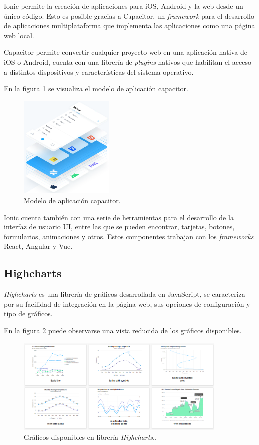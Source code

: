 Ionic permite la creación de aplicaciones para iOS, Android y la web desde un único código. Esto es posible gracias a Capacitor, un \textit{framework} para el desarrollo de aplicaciones multiplataforma que implementa las aplicaciones como una página web local.

Capacitor permite convertir cualquier proyecto web en una aplicación nativa de iOS o Android, cuenta con una librería de \textit{plugins} nativos que habilitan el acceso a distintos dispositivos y características del sistema operativo\citep{ioni2}.

En la figura \ref{fig:capacitor} se visualiza el modelo de aplicación capacitor.

\begin{figure}[htbp]
	\centering
	\includegraphics[width=0.4\textwidth]{./Figures/capacitor.png}
	\caption{Modelo de aplicación capacitor.}
	\label{fig:capacitor}
\end{figure}

Ionic cuenta también con una serie de herramientas para el desarrollo de la interfaz de usuario UI, entre las que se pueden encontrar, tarjetas, botones, formularios, animaciones y otros.
Estos componentes trabajan con los \textit{frameworks} React, Angular y Vue.


\subsection{Highcharts}

\textit{Highcharts} es una librería de gráficos desarrollada en JavaScript, se caracteriza por su  facilidad de integración en la página web, sus opciones de configuración y tipo de gráficos.

En la figura \ref{fig:highcharts}  puede observarse una vista reducida de los gráficos disponibles.
\newpage
\begin{figure}[htbp]
	\centering
	\includegraphics[width=0.9\textwidth]{./Figures/highcharts.png}
	\caption{Gráficos disponibles en librería \textit{Highcharts}.\protect\footnotemark.}
	\label{fig:highcharts}
\end{figure}

